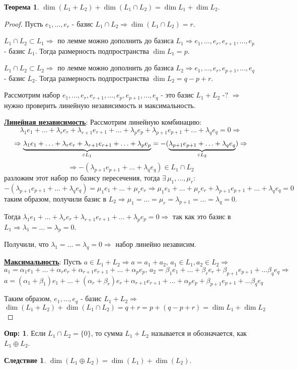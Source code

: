 \documentclass[12pt]{article}
\theoremstyle{definition}
\newtheorem{defn}{Опр:}
\newtheorem{theorem}{Теорема}
\newtheorem{corollary}{Следствие}
\newcommand{\smallerrel}[1]{\mathrel{\mathpalette\smallerrelaux{#1}}}
\newcommand{\smallerrelaux}[2]{\raisebox{.1ex}{\scalebox{.75}{$#1#2$}}}
\newcommand{\smallin}{\smallerrel{\in}}
\begin{document}
\begin{theorem}
	$\dim{(L_1 + L_2)} + \dim{(L_1 \cap L_2)} = \dim{L_1} + \dim{L_2}$.
\end{theorem}
\begin{proof}
	Пусть $e_1, \dotsc, e_r$ - базис $L_1 \cap L_2 \Rightarrow \dim{(L_1 \cap L_2)} = r$. 
	
	$L_1 \cap L_2 \subset L_1 \Rightarrow$ по лемме можно дополнить до базиса $L_1 \Rightarrow e_1,\dotsc, e_r, e_{r+1}, \dotsc, e_p$ - базис $L_1$. Тогда размерность подпространства $\dim{L_1} = p$.
	
	$L_1 \cap L_2 \subset L_2 \Rightarrow$ по лемме можно дополнить до базиса $L_2 \Rightarrow e_1,\dotsc, e_r, e_{p+1}, \dotsc, e_q$ - базис $L_2$. Тогда размерность подпространства $\dim{L_2} = q - p + r$.
	
	Рассмотрим набор $e_1,\dotsc, e_r,e_{r+1}, \dotsc, e_p, e_{p+1},\dotsc, e_q$ - это базис $L_1 + L_2$ -? $\Rightarrow$ нужно проверить линейную независимость и максимальность.
	
	\uline{\textbf{Линейная независимость}}: Рассмотрим линейную комбинацию:
	$$
		\lambda_1 e_1 + \dotsc + \lambda_r e_r + \lambda_{r+1} e_{r+1} + \dotsc + \lambda_p e_p + \lambda_{p+1} e_{p+1} + \dotsc + \lambda_q e_q = 0 \Rightarrow
	$$
	$$
		\Rightarrow \underbrace{\lambda_1 e_1 + \dotsc + \lambda_r e_r + \lambda_{r+1} e_{r+1} + \dotsc + \lambda_p e_p}_{\smallin L_1} = - (\underbrace{\lambda_{p+1} e_{p+1} + \dotsc + \lambda_q e_q}_{\smallin L_2}) \Rightarrow
	$$
	$$
		\Rightarrow	-(\lambda_{p+1} e_{p+1} + \dotsc + \lambda_q e_q) \in L_1 \cap L_2	
	$$
	разложим этот набор по базису пересечения, тогда $\exists \, \mu_1 ,\dotsc , \mu_r$:
	$$
		-(\lambda_{p+1} e_{p+1} + \dotsc + \lambda_q e_q) = \mu_1 e_1 + \dotsc + \mu_r e_r \Rightarrow \mu_1 e_1 + \dotsc + \mu_r e_r + \lambda_{p+1} e_{p+1} + \dotsc + \lambda_q e_q = 0
	$$
	таким образом, получили базис в $L_2 \Rightarrow \mu_1 = \dotsc = \mu_r = \lambda_{p+1} = \dotsc = \lambda_q = 0$. 
	
	Тогда $\lambda_1 e_1 + \dotsc + \lambda_r e_r + \lambda_{r+1} e_{r+1} + \dotsc + \lambda_p e_p = 0 \Rightarrow$ так как это базис в $L_1 \Rightarrow \lambda_1 = \dotsc = \lambda_p = 0$.
	
	Получили, что $\lambda_1 = \dotsc = \lambda_q = 0 \Rightarrow$ набор линейно независим.
		
	\uline{\textbf{Максимальность}}: Пусть $a \in L_1 + L_2 \Rightarrow a = a_1 + a_2, \, a_1 \in L_1, a_2 \in L_2 \Rightarrow$ 
	$$
		a_1 = \alpha_1 e_1 + \dotsc + \alpha_r e_r + \alpha_{r+1} e_{r+1} + \dotsc + \alpha_p e_p, \, a_2 = \beta_1 e_1 + \dotsc + \beta_r e_r + \beta_{p+1} e_{p+1} + \dotsc \beta_q e_q \Rightarrow
	$$
	$$
		a = (\alpha_1 + \beta_1) e_1 + \dotsc + (\alpha_r + \beta_r)e_r + \alpha_{r+1} e_{r+1} + \dotsc + \alpha_p e_p + \beta_{p+1} e_{p+1} + \dotsc \beta_q e_q
	$$
	
	Таким образом, $e_1,\dotsc, e_q$ - базис $L_1 + L_2 \Rightarrow$ 
	$$
		\dim{(L_1 + L_2)} + \dim{(L_1\cap L_2)} = q + r = p + (q - p + r) = \dim{L_1} + \dim{L_2}
	$$
\end{proof}

\begin{defn}
	Если $L_1 \cap L_2 = \{0\}$, то сумма $L_1 + L_2$ называется  и обозначается, как $L_1 \oplus L_2$.
\end{defn}

\begin{corollary}
	$\dim{(L_1 \oplus L_2)} = \dim{(L_1)} + \dim{(L_2)}$.
\end{corollary}
\end{document}
